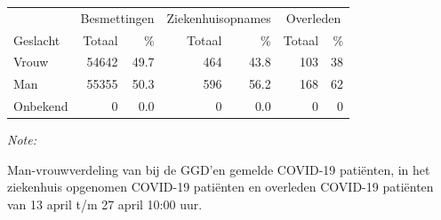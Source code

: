\documentclass[
  english,
  man,floatsintext]{apa6}
\begin{document}
\begin{table}
\centering\begingroup\fontsize{11}{13}\selectfont

\begin{threeparttable}
\begin{tabular}{lrrrrrr}
\toprule
\multicolumn{1}{c}{ } & \multicolumn{2}{c}{Besmettingen} & \multicolumn{2}{c}{Ziekenhuisopnames} & \multicolumn{2}{c}{Overleden} \\
\cmidrule(l{3pt}r{3pt}){2-3} \cmidrule(l{3pt}r{3pt}){4-5} \cmidrule(l{3pt}r{3pt}){6-7}
Geslacht & Totaal & \% & Totaal & \% & Totaal & \%\\
\midrule
Vrouw & 54642 & 49.7 & 464 & 43.8 & 103 & 38\\
Man & 55355 & 50.3 & 596 & 56.2 & 168 & 62\\
Onbekend & 0 & 0.0 & 0 & 0.0 & 0 & 0\\
\bottomrule
\end{tabular}
\begin{tablenotes}
\item \textit{Note: } 
\item Man-vrouwverdeling van bij de GGD’en gemelde COVID-19 patiënten, in het ziekenhuis opgenomen COVID-19 patiënten en overleden COVID-19 patiënten van 13 april t/m 27 april 10:00 uur.
\end{tablenotes}
\end{threeparttable}
\endgroup{}
\end{table}
\newpage
\end{document}
